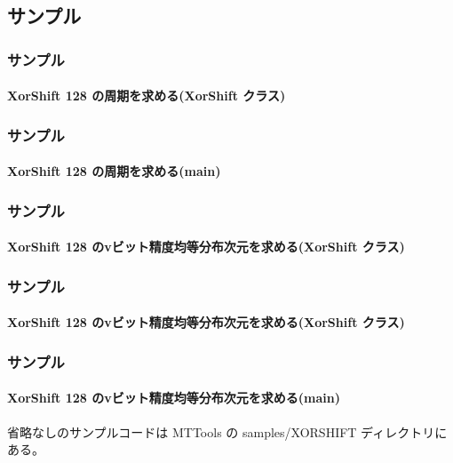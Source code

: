 \documentclass[cjk, dvips, xcolor=dvipsnames, hyperref={bookmarks=false}]{beamer}
\begin{document}
\subsection{サンプル}
\begin{frame}[t]
  \frametitle{サンプル}
  \framesubtitle{XorShift 128 の周期を求める(XorShift クラス)}
%  
  
\end{frame}

\begin{frame}[t]
  \frametitle{サンプル}
  \framesubtitle{XorShift 128 の周期を求める(main)}
%  
  
\end{frame}

\begin{frame}[t]
  \frametitle{サンプル}
  \framesubtitle{XorShift 128 のvビット精度均等分布次元を求める(XorShift クラス)}
%  
  
\end{frame}

\begin{frame}[t]
  \frametitle{サンプル}
  \framesubtitle{XorShift 128 のvビット精度均等分布次元を求める(XorShift クラス)}
%  
  
\end{frame}

\begin{frame}[t]
  \frametitle{サンプル}
  \framesubtitle{XorShift 128 のvビット精度均等分布次元を求める(main)}
%  
  

  \pause
  \vspace{\baselineskip}
  省略なしのサンプルコードは MTTools の samples/XORSHIFT ディレクトリにある。
\end{frame}
\end{document}
